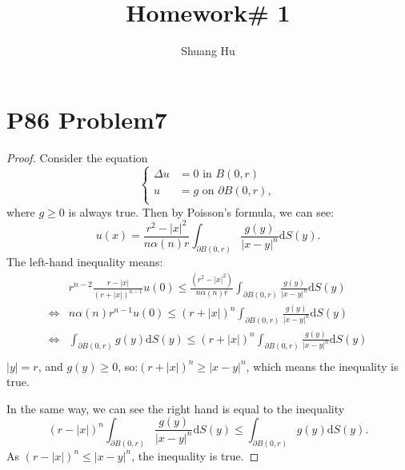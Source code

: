 \documentclass[a4paper]{ctexart}
\title{Homework\# 1}
\author{Shuang Hu}
\newcommand{\dif}{\mathrm{d}}
\begin{document}
\maketitle
\section*{P86 Problem7}
\begin{proof}
Consider the equation
\begin{equation}
    \left\{
        \begin{aligned}
            \Delta u&=0\text{ in }B(0,r)\\
            u&=g\text{ on }\partial B(0,r),\\
        \end{aligned}
    \right.
\end{equation}
where $g\ge 0$ is always true. Then by Poisson's formula, we can see:
\begin{equation}
    u(x)=\frac{r^{2}-|x|^{2}}{n\alpha(n)r}\int_{\partial B(0,r)}\frac{g(y)}{|x-y|^{n}}\dif S(y).
\end{equation}
The left-hand inequality means:
\begin{equation}
    \begin{aligned}
        &r^{n-2}\frac{r-|x|}{(r+|x|)^{n-1}}u(0)\le\frac{(r^{2}-|x|^{2})}{n\alpha(n)r}\int_{\partial B(0,r)}\frac{g(y)}{|x-y|^{n}}\dif S(y)\\
        \Leftrightarrow&
        n\alpha(n)r^{n-1}u(0)\le(r+|x|)^{n}\int_{\partial B(0,r)}\frac{g(y)}{|x-y|^{n}}\dif S(y)\\
        \Leftrightarrow&
        \int_{\partial B(0,r)}g(y)\dif S(y)\le(r+|x|)^{n}\int_{\partial B(0,r)}\frac{g(y)}{|x-y|^{n}}\dif S(y)\\
    \end{aligned}
\end{equation}
$|y|=r$, and $g(y)\ge 0$, so:$(r+|x|)^{n}\ge|x-y|^{n}$, which means the inequality is true.

In the same way, we can see the right hand is equal to the inequality
\begin{equation}
    (r-|x|)^{n}\int_{\partial B(0,r)}\frac{g(y)}{|x-y|^{n}}\dif S(y)\le \int_{\partial B(0,r)}g(y)\dif S(y).
\end{equation}
As $(r-|x|)^{n}\le|x-y|^{n}$, the inequality is true.
\end{proof}
\end{document}
